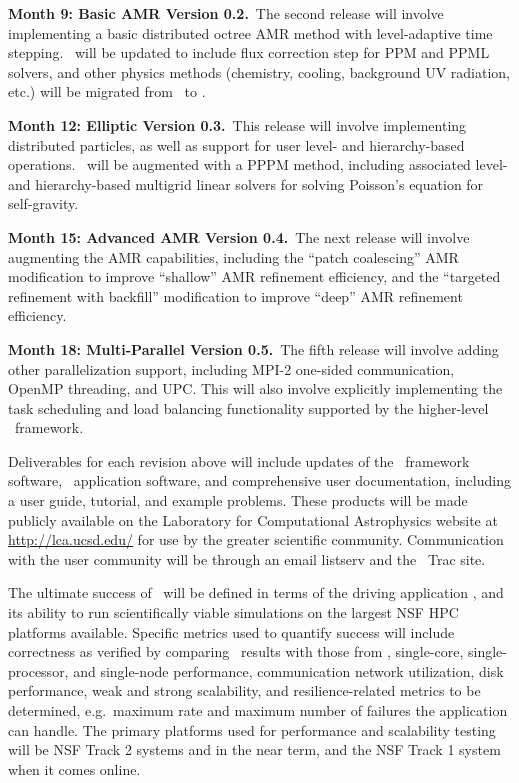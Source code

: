 \documentclass[11pt,letterpaper]{article}
\begin{document}
\textbf{Month 9: Basic AMR Version 0.2.}~The second release will involve
implementing a basic distributed octree AMR method with level-adaptive
time stepping.  \enzoii\ will be updated to include flux correction
step for PPM and PPML solvers, and other physics methods (chemistry,
cooling, background UV radiation, etc.) will be
migrated from \enzo\ to \enzoii.

\textbf{Month 12: Elliptic Version 0.3.}~This release will involve
implementing distributed particles, as well as support for user level-
and hierarchy-based operations.  \enzoii\ will be augmented with a
PPPM method, including associated level- and hierarchy-based multigrid
linear solvers for solving Poisson's equation for self-gravity.

\textbf{Month 15: Advanced AMR Version 0.4.}~The next release will
involve augmenting the AMR capabilities, including the ``patch
coalescing'' AMR modification to improve ``shallow'' AMR refinement
efficiency, and the ``targeted refinement with backfill'' modification
to improve ``deep'' AMR refinement efficiency.

\textbf{Month 18: Multi-Parallel Version 0.5.}~The fifth
release will involve adding other parallelization support, including
MPI-2 one-sided communication, OpenMP threading, and UPC.  This will
also involve explicitly implementing the task scheduling and load
balancing functionality supported by the higher-level \charm\
framework.

Deliverables for each revision above will include updates of the
\cello\ framework software, \enzoii\ application software, and
comprehensive user documentation, including a user guide, tutorial,
and example problems.  These products will be made publicly available
on the Laboratory for Computational Astrophysics website at
\url{http://lca.ucsd.edu/} for use by the greater scientific community.
Communication with the user community will be through an email
listserv and the \cello\ Trac site.  

 The ultimate success of \cello\
will be defined in terms of the driving application \enzoii, and its
ability to run scientifically viable simulations on the largest NSF
HPC platforms available.  Specific metrics used to quantify success
will include correctness as verified by comparing \enzoii\ results
with those from \enzo, single-core, single-processor, and single-node
performance, communication network utilization, disk performance, weak
and strong scalability, and resilience-related metrics to be
determined, e.g.~maximum rate and maximum number of failures the
application can handle.  The primary platforms used for performance
and scalability testing will be NSF Track 2 systems \code{Kraken} and
\code{Ranger} in the near term, and the NSF Track 1 system \code{Blue
  Waters} when it comes online.
\end{document}
